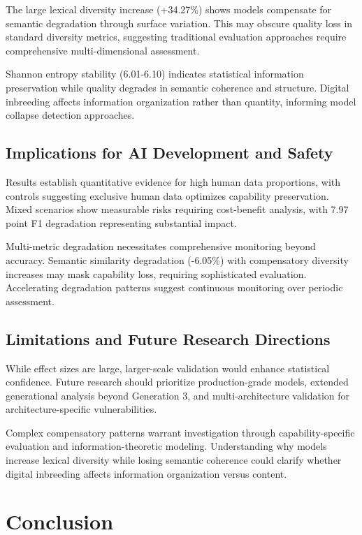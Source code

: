 \documentclass{article}
\begin{document}
The large lexical diversity increase (+34.27\%) shows models compensate for semantic degradation through surface variation. This may obscure quality loss in standard diversity metrics, suggesting traditional evaluation approaches require comprehensive multi-dimensional assessment.

Shannon entropy stability (6.01-6.10) indicates statistical information preservation while quality degrades in semantic coherence and structure. Digital inbreeding affects information organization rather than quantity, informing model collapse detection approaches.

\subsection{Implications for AI Development and Safety}

Results establish quantitative evidence for high human data proportions, with controls suggesting exclusive human data optimizes capability preservation. Mixed scenarios show measurable risks requiring cost-benefit analysis, with 7.97 point F1 degradation representing substantial impact.

Multi-metric degradation necessitates comprehensive monitoring beyond accuracy. Semantic similarity degradation (-6.05\%) with compensatory diversity increases may mask capability loss, requiring sophisticated evaluation. Accelerating degradation patterns suggest continuous monitoring over periodic assessment.

\subsection{Limitations and Future Research Directions}

While effect sizes are large, larger-scale validation would enhance statistical confidence. Future research should prioritize production-grade models, extended generational analysis beyond Generation 3, and multi-architecture validation for architecture-specific vulnerabilities.

Complex compensatory patterns warrant investigation through capability-specific evaluation and information-theoretic modeling. Understanding why models increase lexical diversity while losing semantic coherence could clarify whether digital inbreeding affects information organization versus content.

\section{Conclusion}
\end{document}
